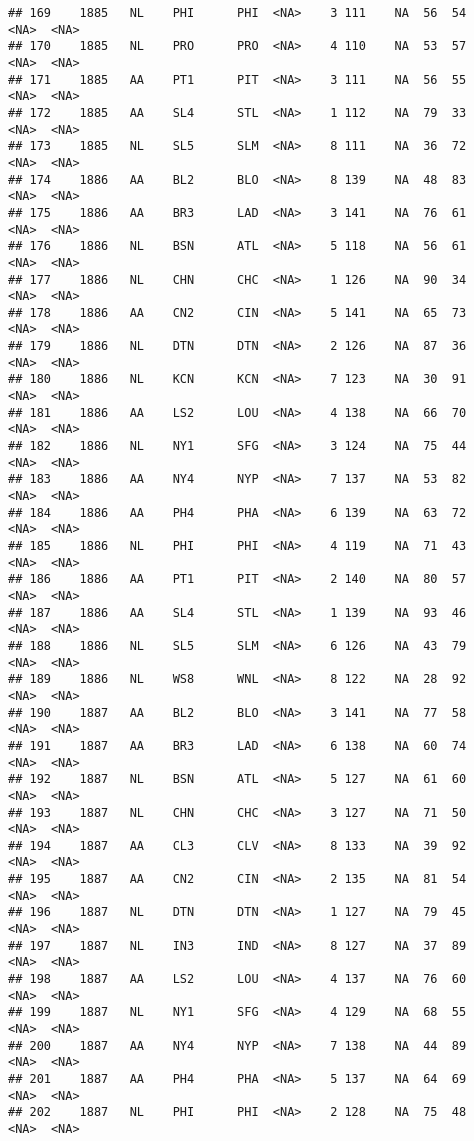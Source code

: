 \documentclass[]{article}
\begin{document}
\begin{verbatim}
## 169    1885   NL    PHI      PHI  <NA>    3 111    NA  56  54   <NA>  <NA>
## 170    1885   NL    PRO      PRO  <NA>    4 110    NA  53  57   <NA>  <NA>
## 171    1885   AA    PT1      PIT  <NA>    3 111    NA  56  55   <NA>  <NA>
## 172    1885   AA    SL4      STL  <NA>    1 112    NA  79  33   <NA>  <NA>
## 173    1885   NL    SL5      SLM  <NA>    8 111    NA  36  72   <NA>  <NA>
## 174    1886   AA    BL2      BLO  <NA>    8 139    NA  48  83   <NA>  <NA>
## 175    1886   AA    BR3      LAD  <NA>    3 141    NA  76  61   <NA>  <NA>
## 176    1886   NL    BSN      ATL  <NA>    5 118    NA  56  61   <NA>  <NA>
## 177    1886   NL    CHN      CHC  <NA>    1 126    NA  90  34   <NA>  <NA>
## 178    1886   AA    CN2      CIN  <NA>    5 141    NA  65  73   <NA>  <NA>
## 179    1886   NL    DTN      DTN  <NA>    2 126    NA  87  36   <NA>  <NA>
## 180    1886   NL    KCN      KCN  <NA>    7 123    NA  30  91   <NA>  <NA>
## 181    1886   AA    LS2      LOU  <NA>    4 138    NA  66  70   <NA>  <NA>
## 182    1886   NL    NY1      SFG  <NA>    3 124    NA  75  44   <NA>  <NA>
## 183    1886   AA    NY4      NYP  <NA>    7 137    NA  53  82   <NA>  <NA>
## 184    1886   AA    PH4      PHA  <NA>    6 139    NA  63  72   <NA>  <NA>
## 185    1886   NL    PHI      PHI  <NA>    4 119    NA  71  43   <NA>  <NA>
## 186    1886   AA    PT1      PIT  <NA>    2 140    NA  80  57   <NA>  <NA>
## 187    1886   AA    SL4      STL  <NA>    1 139    NA  93  46   <NA>  <NA>
## 188    1886   NL    SL5      SLM  <NA>    6 126    NA  43  79   <NA>  <NA>
## 189    1886   NL    WS8      WNL  <NA>    8 122    NA  28  92   <NA>  <NA>
## 190    1887   AA    BL2      BLO  <NA>    3 141    NA  77  58   <NA>  <NA>
## 191    1887   AA    BR3      LAD  <NA>    6 138    NA  60  74   <NA>  <NA>
## 192    1887   NL    BSN      ATL  <NA>    5 127    NA  61  60   <NA>  <NA>
## 193    1887   NL    CHN      CHC  <NA>    3 127    NA  71  50   <NA>  <NA>
## 194    1887   AA    CL3      CLV  <NA>    8 133    NA  39  92   <NA>  <NA>
## 195    1887   AA    CN2      CIN  <NA>    2 135    NA  81  54   <NA>  <NA>
## 196    1887   NL    DTN      DTN  <NA>    1 127    NA  79  45   <NA>  <NA>
## 197    1887   NL    IN3      IND  <NA>    8 127    NA  37  89   <NA>  <NA>
## 198    1887   AA    LS2      LOU  <NA>    4 137    NA  76  60   <NA>  <NA>
## 199    1887   NL    NY1      SFG  <NA>    4 129    NA  68  55   <NA>  <NA>
## 200    1887   AA    NY4      NYP  <NA>    7 138    NA  44  89   <NA>  <NA>
## 201    1887   AA    PH4      PHA  <NA>    5 137    NA  64  69   <NA>  <NA>
## 202    1887   NL    PHI      PHI  <NA>    2 128    NA  75  48   <NA>  <NA>

\end{verbatim}
\end{document}
